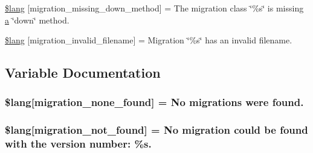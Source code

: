 \begin{DoxyCompactItemize}
\item 
\hyperlink{system_2language_2english_2migration__lang_8php_a6e835ce0b327b8ea1df42bfc7a59f1cd}{\$lang} \mbox{[}\textquotesingle{}migration\+\_\+missing\+\_\+down\+\_\+method\textquotesingle{}\mbox{]} = \textquotesingle{}The migration class \char`\"{}\%s\char`\"{} is missing \hyperlink{_admin_2assets_2js_2bootstrap_8min_8js_a1f5870dcf487187f13d5fd328ed9e6e7}{a} \char`\"{}down\char`\"{} method.\textquotesingle{}
\item 
\hyperlink{system_2language_2english_2migration__lang_8php_a75ef7572f25674e4dd1e36a0d61080fa}{\$lang} \mbox{[}\textquotesingle{}migration\+\_\+invalid\+\_\+filename\textquotesingle{}\mbox{]} = \textquotesingle{}Migration \char`\"{}\%s\char`\"{} has an invalid filename.\textquotesingle{}
\end{DoxyCompactItemize}


\subsection{Variable Documentation}
\hypertarget{system_2language_2english_2migration__lang_8php_affa6337f0973de810b3c61491deae6b1}{}
\subsubsection[{\$lang}]{\setlength{\rightskip}{0pt plus 5cm}\$lang\mbox{[}\textquotesingle{}migration\+\_\+none\+\_\+found\textquotesingle{}\mbox{]} = \textquotesingle{}No migrations were found.\textquotesingle{}}\label{system_2language_2english_2migration__lang_8php_affa6337f0973de810b3c61491deae6b1}
\hypertarget{system_2language_2english_2migration__lang_8php_a92dd777422d70950993d43f4d0c31b1b}{}
\subsubsection[{\$lang}]{\setlength{\rightskip}{0pt plus 5cm}\$lang\mbox{[}\textquotesingle{}migration\+\_\+not\+\_\+found\textquotesingle{}\mbox{]} = \textquotesingle{}No migration could be found with the {\bf version} number\+: \%s.\textquotesingle{}}\label{system_2language_2english_2migration__lang_8php_a92dd777422d70950993d43f4d0c31b1b}
\hypertarget{system_2language_2english_2migration__lang_8php_ab1f43d98bc1365f4b753d783a8802697}{}
